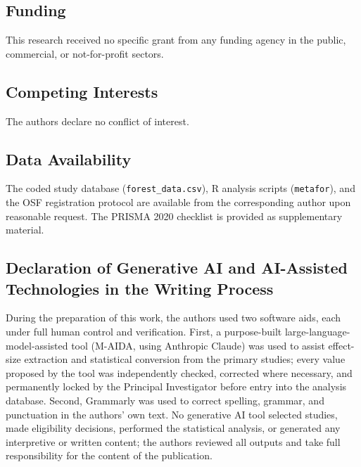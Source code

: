 \documentclass[
  12pt,a4paper]{article}
\begin{document}
\hypertarget{funding}{%
\subsection{Funding}\label{funding}}

This research received no specific grant from any funding agency in the
public, commercial, or not-for-profit sectors.

\hypertarget{competing-interests}{%
\subsection{Competing Interests}\label{competing-interests}}

The authors declare no conflict of interest.

\hypertarget{data-availability}{%
\subsection{Data Availability}\label{data-availability}}

The coded study database (\texttt{forest\_data.csv}), R analysis scripts
(\texttt{metafor}), and the OSF registration protocol are available from
the corresponding author upon reasonable request. The PRISMA 2020
checklist is provided as supplementary material.

\hypertarget{declaration-of-generative-ai-and-ai-assisted-technologies-in-the-writing-process}{%
\subsection{Declaration of Generative AI and AI-Assisted Technologies in
the Writing
Process}\label{declaration-of-generative-ai-and-ai-assisted-technologies-in-the-writing-process}}

During the preparation of this work, the authors used two software aids,
each under full human control and verification. First, a purpose-built
large-language-model-assisted tool (M-AIDA, using Anthropic Claude) was
used to assist effect-size extraction and statistical conversion from
the primary studies; every value proposed by the tool was independently
checked, corrected where necessary, and permanently locked by the
Principal Investigator before entry into the analysis database. Second,
Grammarly was used to correct spelling, grammar, and punctuation in the
authors' own text. No generative AI tool selected studies, made
eligibility decisions, performed the statistical analysis, or generated
any interpretive or written content; the authors reviewed all outputs
and take full responsibility for the content of the publication.
\end{document}
